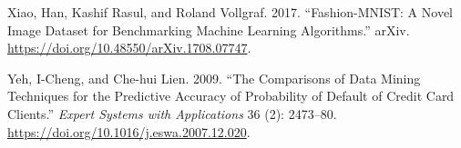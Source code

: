 \documentclass{juliacon}
\newlength{\cslhangindent}
\newlength{\cslentryspacingunit} %
\newenvironment{CSLReferences}[2] %
 {%
  \setlength{\parindent}{0pt}
  \ifodd #1
  \let\oldpar\par
  \def\par{\hangindent=\cslhangindent\oldpar}
  \fi
  \setlength{\parskip}{#2\cslentryspacingunit}
 }%
 {}
\begin{document}
\begin{CSLReferences}{1}{0}
\leavevmode{}%
Xiao, Han, Kashif Rasul, and Roland Vollgraf. 2017. {``Fashion-{MNIST}:
A {Novel} {Image} {Dataset} for {Benchmarking} {Machine} {Learning}
{Algorithms}.''} arXiv. \url{https://doi.org/10.48550/arXiv.1708.07747}.

\leavevmode{}%
Yeh, I-Cheng, and Che-hui Lien. 2009. {``The Comparisons of Data Mining
Techniques for the Predictive Accuracy of Probability of Default of
Credit Card Clients.''} \emph{Expert Systems with Applications} 36 (2):
2473--80. \url{https://doi.org/10.1016/j.eswa.2007.12.020}.

\end{CSLReferences}
\end{document}
